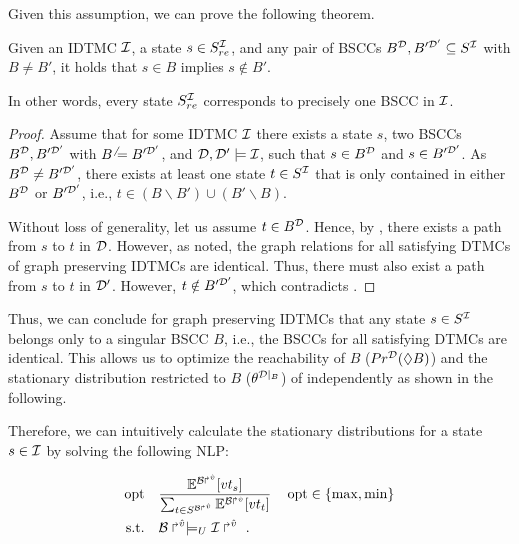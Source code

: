 Given this assumption, we can prove the following theorem.
\begin{theorem}
    Given an IDTMC $\mathcal{I}$, a state $s\in S_{re}^{\mathcal{I}}$, and any pair of BSCCs $B^{\mathcal{D}},B'^{\mathcal{D}'} \subseteq S^{\mathcal{I}}$ with $B \neq B'$, it holds that $s\in B$ implies $s\notin B'$.
\end{theorem}
In other words, every state $S_{re}^{\mathcal{I}}$ corresponds to precisely one BSCC in $\mathcal{I}$.

\begin{proof}
    Assume that for some IDTMC $\mathcal{I}$ there exists a state $s$, two BSCCs $B^{\mathcal{D}}, B'^{\mathcal{D}'}$ with $B^\neq B'^{\mathcal{D}'}$, and $\mathcal{D}, \mathcal{D}'\models \mathcal{I}$, such that $s\in B^{\mathcal{D}}$ and $s\in B'^{\mathcal{D}'}$. As $B^{\mathcal{D}}\neq B'^{\mathcal{D}'}$, there exists at least one state $t\in S^{\mathcal{I}}$ that is only contained in either $B^{\mathcal{D}}$ or $B'^{\mathcal{D}'}$, i.e., $t\in (B\backslash B') \cup (B'\backslash B)$. 
    
    Without loss of generality, let us assume $t\in B^{\mathcal{D}}$. Hence, by , there exists a path from $s$ to $t$ in $\mathcal{D}$. However, as noted, the graph relations for all satisfying DTMCs of graph preserving IDTMCs are identical. Thus, there must also exist a path from $s$ to $t$ in $\mathcal{D}'$. However, $t\notin B'^{\mathcal{D}'}$, which contradicts .
\end{proof}


Thus, we can conclude for graph preserving IDTMCs that any state $s\in S^{\mathcal{I}}$ belongs only to a singular BSCC $B$, i.e., the BSCCs for all satisfying DTMCs are identical. This allows us to optimize the reachability of $B$ ($Pr^{\mathcal{D}}(\lozenge B)$) and the stationary distribution restricted to $B$ ($\theta^{\mathcal{D}|_B}$) of  independently as shown in the following.

Therefore, we can intuitively calculate the stationary distributions for a state $s\in \mathcal{I}$ by solving the following NLP:

\[
   \begin{aligned}
        \operatorname{opt} \quad & \frac{\mathbb{E}^{\mathcal{B}\Rsh^{\hat{v}}}[vt_s]}{\sum_{t\in S^{\mathcal{B}\Rsh^{\hat{v}}}}\mathbb{E}^{\mathcal{B}\Rsh^{\hat{v}}}[vt_t]} & & \operatorname{opt}\in\{\max,\min\}\\
        \text{s.t.} \quad & \mathcal{B}\Rsh^{\hat{v}} \models_U \mathcal{I}\Rsh^{\hat{v}}\ .
    \end{aligned}
\]

